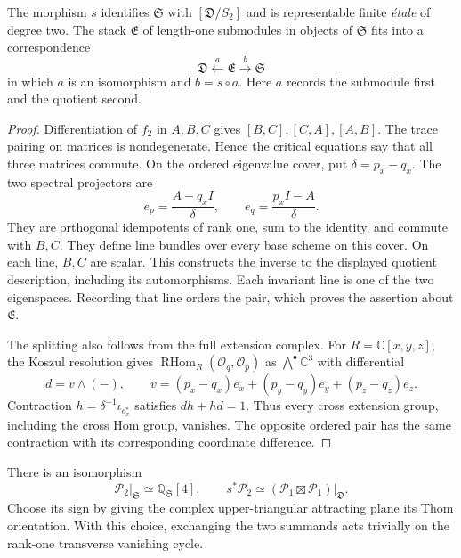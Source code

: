 \begin{lemma}
\label{lem:c3-separated-correspondence}
The morphism $s$ identifies $\mathfrak S$ with
$[\mathfrak D/S_2]$ and is representable finite \emph{\'{e}tale} of
degree two. The stack $\mathfrak E$ of length-one submodules in
objects of $\mathfrak S$ fits into a correspondence
\[
 \mathfrak D\xleftarrow{\ a\ }\mathfrak E
 \xrightarrow{\ b\ }\mathfrak S
\]
in which $a$ is an isomorphism and $b=s\circ a$.
Here $a$ records the submodule first and the quotient second.
\end{lemma}

\begin{proof}
Differentiation of $f_2$ in $A,B,C$ gives $[B,C],[C,A],[A,B]$.
The trace pairing on matrices is nondegenerate. Hence the critical
equations say that all three matrices commute.
On the ordered eigenvalue cover, put
$\delta=p_x-q_x$. The two spectral projectors are
\[
 e_p=\frac{A-q_xI}{\delta},\qquad
 e_q=\frac{p_xI-A}{\delta}.
\]
They are orthogonal idempotents of rank one, sum to the identity,
and commute with $B,C$. They define line bundles over every base
scheme on this cover. On each line, $B,C$ are scalar.
This constructs the inverse to the displayed quotient description,
including its automorphisms. Each invariant line is one of the
two eigenspaces. Recording that line orders the pair, which proves
the assertion about $\mathfrak E$.

The splitting also follows from the full extension complex.
For $R=\mathbb C[x,y,z]$, the Koszul resolution gives
$\operatorname{RHom}_R(\mathcal O_q,\mathcal O_p)$ as
$\bigwedge^\bullet\mathbb C^3$ with differential
\[
 d=v\wedge(-),\qquad
 v=(p_x-q_x)e_x+(p_y-q_y)e_y+(p_z-q_z)e_z.
\]
Contraction $h=\delta^{-1}\iota_{e_x^*}$ satisfies $dh+hd=1$.
Thus every cross extension group, including the cross Hom group,
vanishes. The opposite ordered pair has the same contraction with
its corresponding coordinate difference.
\end{proof}

\begin{lemma}
\label{lem:c3-separated-vanishing}
There is an isomorphism
\[
 \left.\mathcal P_2\right|_{\mathfrak S}
 \simeq\mathbb Q_{\mathfrak S}[4],\qquad
 s^*\mathcal P_2\simeq
 \left.(\mathcal P_1\boxtimes\mathcal P_1)\right|_{\mathfrak D}.
\]
Choose its sign by giving the complex upper-triangular attracting
plane its Thom orientation. With this choice, exchanging the two
summands acts trivially on the rank-one transverse vanishing cycle.
\end{lemma}


